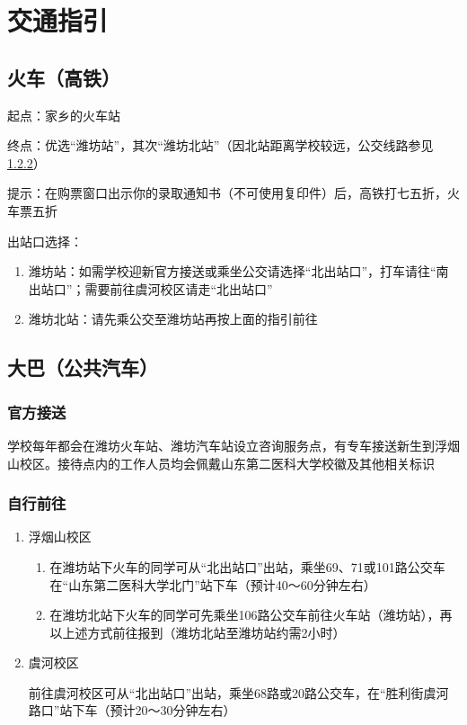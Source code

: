 
\section[交通指引]{交通指引}
\label{goto_school}
\subsection[火车（高铁）]{火车（高铁）}
起点：家乡的火车站

终点：优选“潍坊站”，其次“潍坊北站”（因北站距离学校较远，公交线路参见\uline{\ref{bus}}）

提示：在购票窗口出示你的录取通知书（不可使用复印件）后，高铁打七五折，火车票五折

出站口选择：
\begin{enumerate}
    \item 潍坊站：如需学校迎新官方接送或乘坐公交请选择“北出站口”，打车请往“南出站口”；需要前往虞河校区请走“北出站口”
    \item 潍坊北站：请先乘公交至潍坊站再按上面的指引前往
\end{enumerate}

\subsection[大巴（公共汽车）]{大巴（公共汽车）}

\subsubsection[官方接送]{官方接送}
学校每年都会在潍坊火车站、潍坊汽车站设立咨询服务点，有专车接送新生到浮烟山校区。接待点内的工作人员均会佩戴山东第二医科大学校徽及其他相关标识

\subsubsection[自行前往]{自行前往}
\label{bus}
\begin{enumerate}
    \item 浮烟山校区
          \begin{enumerate}
              \item 在潍坊站下火车的同学可从“北出站口”出站，乘坐69、71或101路公交车在“山东第二医科大学北门”站下车（预计40～60分钟左右）
              \item 在潍坊北站下火车的同学可先乘坐106路公交车前往火车站（潍坊站），再以上述方式前往报到（潍坊北站至潍坊站约需2小时）
          \end{enumerate}
    \item 虞河校区

          前往虞河校区可从“北出站口”出站，乘坐68路或20路公交车，在“胜利街虞河路口”站下车（预计20～30分钟左右）
\end{enumerate}

